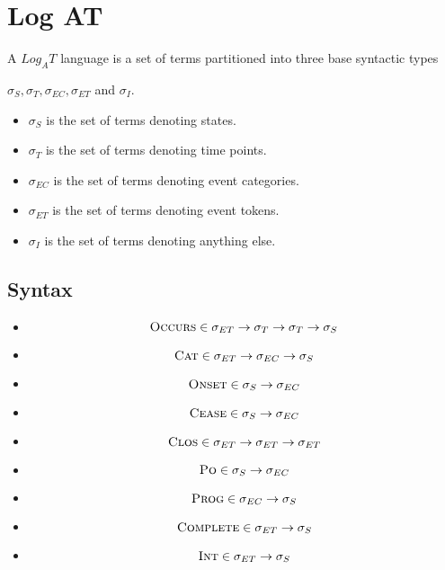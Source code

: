 \chapter{Log AT}

A $Log_A T$ language is a set of terms partitioned into three base syntactic types

$\sigma_S, \sigma_T, \sigma_{EC}, \sigma_{ET}$ and $ \sigma_I$.

\begin{itemize}
	\item $\sigma_S$ is the set of terms denoting states.
	\item $\sigma_T$ is the set of terms denoting time points.
	\item $\sigma_{EC}$ is the set of terms denoting event categories.
	\item $\sigma_{ET}$ is the set of terms denoting event tokens.
	\item $\sigma_I$ is the set of terms denoting anything else.
\end{itemize}


\section{Syntax}


\begin{itemize}

	\item
	      \[
		      \textsc{Occurs} \in \sigma_{ET} \to \sigma_T \to \sigma_T \to \sigma_S
	      \]

	\item
	      \[
		      \textsc{Cat} \in \sigma_{ET} \to \sigma_{EC} \to \sigma_S
	      \]

	\item
	      \[
		      \textsc{Onset} \in \sigma_S \to \sigma_{EC}
	      \]

	\item
	      \[
		      \textsc{Cease} \in \sigma_S \to \sigma_{EC}
	      \]

	\item
	      \[
		      \textsc{Clos} \in \sigma_{ET} \to \sigma_{ET} \to \sigma_{ET}
	      \]

	\item
	      \[
		      \textsc{Po} \in \sigma_S \to \sigma_{EC}
	      \]

	\item
	      \[
		      \textsc{Prog} \in \sigma_{EC} \to \sigma_S
	      \]
	\item \[
		      \textsc{Complete} \in \sigma_{ET} \to \sigma_S
	      \]
	\item \[
		      \textsc{Int} \in \sigma_{ET} \to \sigma_S
	      \]
\end{itemize}

